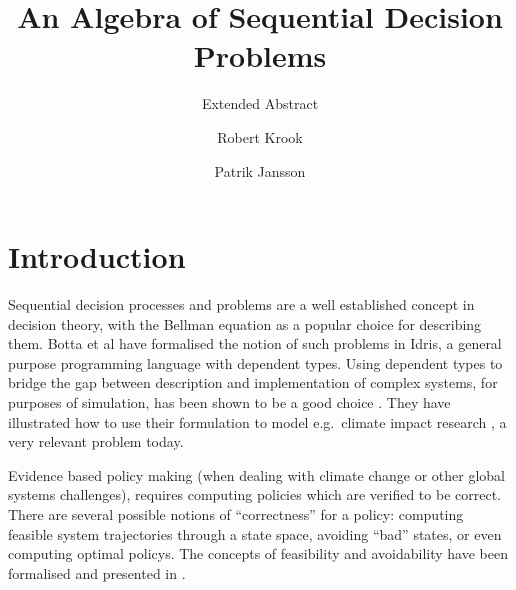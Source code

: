 \documentclass[sigplan,review]{acmart}\settopmatter{printfolios=true,printccs=false,printacmref=false}
\begin{document}
\title{An Algebra of Sequential Decision Problems}
\subtitle{Extended Abstract}
\author{Robert Krook}

\author{Patrik Jansson}


%  

\maketitle

\section{Introduction}
\label{sec:introduction}
Sequential decision processes and problems are a well established concept in decision theory, with the Bellman equation \cite{Bellman1957} as a popular choice for describing them.
%
Botta et al \cite{brady2013idris} have formalised the notion of such problems in Idris, a general purpose programming language with dependent types.
%
Using dependent types to bridge the gap between description and implementation of complex systems, for purposes of simulation, has been shown to be a good choice \cite{ionescujansson2013DTPinSciComp}.
%
They have illustrated how to use their formulation to model e.g.\ climate impact research \cite{esd-2017-86}, a very relevant problem today.
%

%
Evidence based policy making (when dealing with climate change or other global systems challenges), requires computing policies which are verified to be correct.
%
There are several possible notions of ``correctness'' for a policy: computing feasible system trajectories through a state space, avoiding ``bad'' states, or even computing optimal policys.
%
The concepts of feasibility and avoidability have been formalised and presented in \citet{botta_jansson_ionescu_2017_avoidability}.
%
\end{document}
